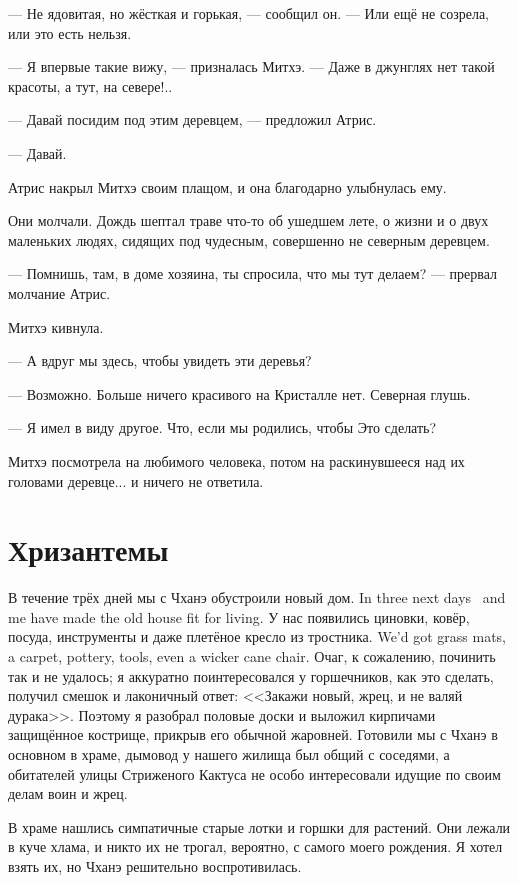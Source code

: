 --- Не ядовитая, но жёсткая и горькая, --- сообщил он.
--- Или ещё не созрела, или это есть нельзя.

--- Я впервые такие вижу, --- призналась Митхэ.
--- Даже в джунглях нет такой красоты, а тут, на севере!..

--- Давай посидим под этим деревцем, --- предложил Атрис.

--- Давай.

Атрис накрыл Митхэ своим плащом, и она благодарно улыбнулась ему.

Они молчали.
Дождь шептал траве что-то об ушедшем лете, о жизни и о двух маленьких людях, сидящих под чудесным, совершенно не северным деревцем.

--- Помнишь, там, в доме хозяина, ты спросила, что мы тут делаем? --- прервал молчание Атрис.

Митхэ кивнула.

--- А вдруг мы здесь, чтобы увидеть эти деревья?

--- Возможно.
Больше ничего красивого на Кристалле нет.
Северная глушь.

--- Я имел в виду другое.
Что, если мы родились, чтобы Это сделать?

Митхэ посмотрела на любимого человека, потом на раскинувшееся над их головами деревце... и ничего не ответила.

\section{Хризантемы}

{В течение трёх дней мы с Чханэ обустроили новый дом.}
{In three next days \Chhanei\ and me have made the old house fit for living.}
{У нас появились циновки, ковёр, посуда, инструменты и даже плетёное кресло из тростника.}
{We'd got grass mats, a carpet, pottery, tools, even a wicker cane chair.}
Очаг, к сожалению, починить так и не удалось;
я аккуратно поинтересовался у горшечников, как это сделать, получил смешок и лаконичный ответ: <<Закажи новый, жрец, и не валяй дурака>>.
Поэтому я разобрал половые доски и выложил кирпичами защищённое кострище, прикрыв его обычной жаровней.
Готовили мы с Чханэ в основном в храме, дымовод у нашего жилища был общий с соседями\FM, а обитателей улицы Стриженого Кактуса не особо интересовали идущие по своим делам воин и жрец.

В храме нашлись симпатичные старые лотки и горшки для растений.
Они лежали в куче хлама, и никто их не трогал, вероятно, с самого моего рождения.
Я хотел взять их, но Чханэ решительно воспротивилась.

